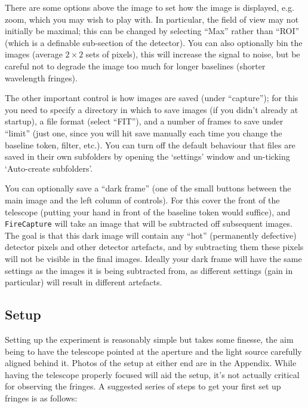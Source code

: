 \documentclass[11pt]{article}
\begin{document}
There are some options above the image to set how the image is displayed, e.g. zoom, which you may wish to play with. In particular, the field of view may not initially be maximal; this can be changed by selecting ``Max'' rather than ``ROI'' (which is a definable sub-section of the detector). You can also optionally bin the images (average $2 \times 2$ sets of pixels), this will increase the signal to noise, but be careful not to degrade the image too much for longer baselines (shorter wavelength fringes).

The other important control is how images are saved (under ``capture''); for this you need to specify a directory in which to save images (if you didn't already at startup), a file format (select ``FIT''), and a number of frames to save under ``limit'' (just one, since you will hit save manually each time you change the baseline token, filter, etc.). You can turn off the default behaviour that files are saved in their own subfolders by opening the `settings' window and un-ticking `Auto-create subfolders'.

You can optionally save a ``dark frame'' (one of the small buttons between the main image and the left column of controls). For this cover the front of the telescope (putting your hand in front of the baseline token would suffice), and \texttt{FireCapture} will take an image that will be subtracted off subsequent images. The goal is that this dark image will contain any ``hot'' (permanently defective) detector pixels and other detector artefacts, and by subtracting them these pixels will not be visible in the final images. Ideally your dark frame will have the same settings as the images it is being subtracted from, as different settings (gain in particular) will result in different artefacts.

\subsection{Setup}\label{sec:setup}

Setting up the experiment is reasonably simple but takes some finesse, the aim being to have the telescope pointed at the aperture and the light source carefully aligned behind it. Photos of the setup at either end are in the Appendix. While having the telescope properly focused will aid the setup, it's not actually critical for observing the fringes. A suggested series of steps to get your first set up fringes is as follows:
\end{document}
